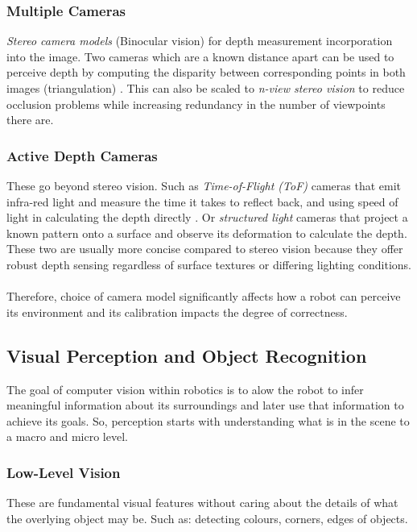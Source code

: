 \subsubsection{Multiple Cameras}
\emph{Stereo camera models} (Binocular vision) for depth measurement incorporation into the image. Two cameras which are a known distance apart can be used to perceive depth by computing the disparity between corresponding points in both images (triangulation) \cite{hamzah2016literature}. This can also be scaled to \emph{n-view stereo vision} to reduce occlusion problems while increasing redundancy in the number of viewpoints there are.\label{sec:nview}

\subsubsection{Active Depth Cameras}
These go beyond stereo vision. Such as \emph{Time-of-Flight (ToF)} cameras that emit infra-red light and measure the time it takes to reflect back, and using speed of light in calculating the depth directly \cite{foix2011tof,zanuttigh2016time}. Or \emph{structured light} cameras that project a known pattern onto a surface and observe its deformation to calculate the depth. These two are usually more concise compared to stereo vision because they offer robust depth sensing regardless of surface textures or differing lighting conditions.
\\\\
Therefore, choice of camera model significantly affects how a robot can perceive its environment and its calibration impacts the degree of correctness.

\subsection{Visual Perception and Object Recognition}
  The goal of computer vision within robotics is to alow the robot to infer meaningful information about its surroundings and later use that information to achieve its goals. So, perception starts with understanding what is in the scene to a macro and micro level. 
  
  \subsubsection{Low-Level Vision}
    These are fundamental visual features without caring about the details of what the overlying object may be. Such as: detecting colours, corners, edges of objects. 

